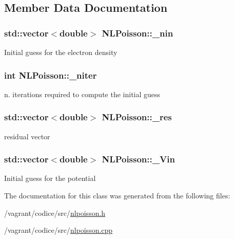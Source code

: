 \subsection{Member Data Documentation}
\hypertarget{classNLPoisson_a6a4fd2946efe89cce686d43889f31eb3}{
\subsubsection[{\-\_\-nin}]{\setlength{\rightskip}{0pt plus 5cm}std\-::vector$<$double$>$ N\-L\-Poisson\-::\-\_\-nin\hspace{0.3cm}{\ttfamily [protected]}}}\label{classNLPoisson_a6a4fd2946efe89cce686d43889f31eb3}
Initial guess for the electron density \hypertarget{classNLPoisson_ab3168e1f22563d7d9a36feb53e915ca1}{
\subsubsection[{\-\_\-niter}]{\setlength{\rightskip}{0pt plus 5cm}int N\-L\-Poisson\-::\-\_\-niter\hspace{0.3cm}{\ttfamily [protected]}}}\label{classNLPoisson_ab3168e1f22563d7d9a36feb53e915ca1}
n. iterations required to compute the initial guess \hypertarget{classNLPoisson_ab6ae242b8dba8c26f1a0ad8aa1e93f10}{
\subsubsection[{\-\_\-res}]{\setlength{\rightskip}{0pt plus 5cm}std\-::vector$<$double$>$ N\-L\-Poisson\-::\-\_\-res\hspace{0.3cm}{\ttfamily [protected]}}}\label{classNLPoisson_ab6ae242b8dba8c26f1a0ad8aa1e93f10}
residual vector \hypertarget{classNLPoisson_a0fffe8f4cdcc6ed59ec7c83527c2ec2b}{
\subsubsection[{\-\_\-\-Vin}]{\setlength{\rightskip}{0pt plus 5cm}std\-::vector$<$double$>$ N\-L\-Poisson\-::\-\_\-\-Vin\hspace{0.3cm}{\ttfamily [protected]}}}\label{classNLPoisson_a0fffe8f4cdcc6ed59ec7c83527c2ec2b}
Initial guess for the potential 

The documentation for this class was generated from the following files\-:\begin{DoxyCompactItemize}
\item 
/vagrant/codice/src/\hyperlink{nlpoisson_8h}{nlpoisson.\-h}\item 
/vagrant/codice/src/\hyperlink{nlpoisson_8cpp}{nlpoisson.\-cpp}\end{DoxyCompactItemize}
